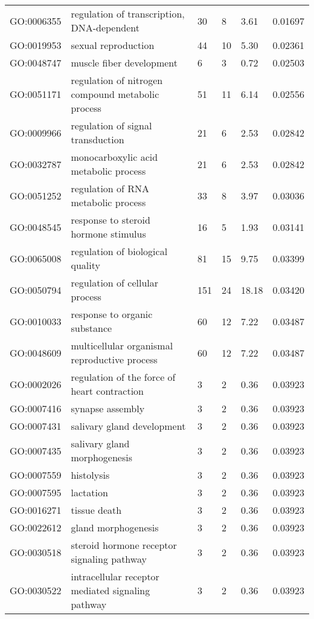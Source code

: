 \documentclass[10pt]{bmc_article}
\newenvironment{bmcformat}{\begin{raggedright}\baselineskip20pt\sloppy\setboolean{publ}{false}}{\end{raggedright}\baselineskip20pt\sloppy}
\begin{document}
\begin{bmcformat}
\begin{longtable}{lp{3cm}llll}
  GO:0006355 & regulation of transcription, DNA-dependent &  30 &   8 & 3.61 & 0.01697 \\ 
  GO:0019953 & sexual reproduction &  44 &  10 & 5.30 & 0.02361 \\ 
  GO:0048747 & muscle fiber development &   6 &   3 & 0.72 & 0.02503 \\ 
  GO:0051171 & regulation of nitrogen compound metabolic process &  51 &  11 & 6.14 & 0.02556 \\ 
  GO:0009966 & regulation of signal transduction &  21 &   6 & 2.53 & 0.02842 \\ 
  GO:0032787 & monocarboxylic acid metabolic process &  21 &   6 & 2.53 & 0.02842 \\ 
  GO:0051252 & regulation of RNA metabolic process &  33 &   8 & 3.97 & 0.03036 \\ 
  GO:0048545 & response to steroid hormone stimulus &  16 &   5 & 1.93 & 0.03141 \\ 
  GO:0065008 & regulation of biological quality &  81 &  15 & 9.75 & 0.03399 \\ 
  GO:0050794 & regulation of cellular process & 151 &  24 & 18.18 & 0.03420 \\ 
  GO:0010033 & response to organic substance &  60 &  12 & 7.22 & 0.03487 \\ 
  GO:0048609 & multicellular organismal reproductive process &  60 &  12 & 7.22 & 0.03487 \\ 
  GO:0002026 & regulation of the force of heart contraction &   3 &   2 & 0.36 & 0.03923 \\ 
  GO:0007416 & synapse assembly &   3 &   2 & 0.36 & 0.03923 \\ 
  GO:0007431 & salivary gland development &   3 &   2 & 0.36 & 0.03923 \\ 
  GO:0007435 & salivary gland morphogenesis &   3 &   2 & 0.36 & 0.03923 \\ 
  GO:0007559 & histolysis &   3 &   2 & 0.36 & 0.03923 \\ 
  GO:0007595 & lactation &   3 &   2 & 0.36 & 0.03923 \\ 
  GO:0016271 & tissue death &   3 &   2 & 0.36 & 0.03923 \\ 
  GO:0022612 & gland morphogenesis &   3 &   2 & 0.36 & 0.03923 \\ 
  GO:0030518 & steroid hormone receptor signaling pathway &   3 &   2 & 0.36 & 0.03923 \\ 
  GO:0030522 & intracellular receptor mediated signaling pathway &   3 &   2 & 0.36 & 0.03923 \\ 

\end{longtable}
\end{bmcformat}
\end{document}
